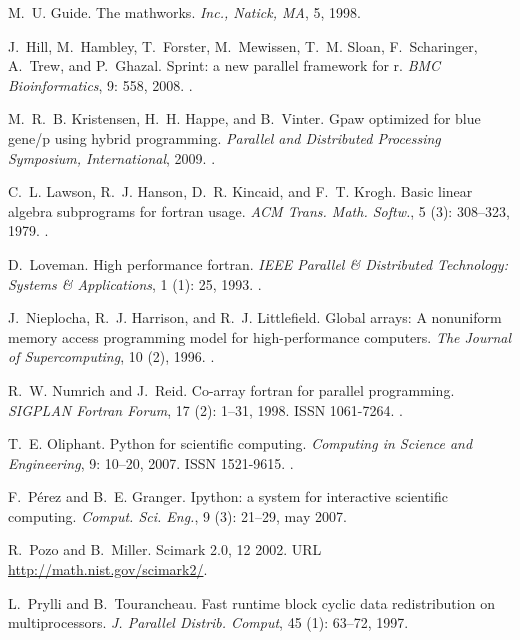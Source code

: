 \documentclass{sigplanconf}
\begin{document}
\begin{thebibliography}{18}
M.~U. Guide.
\newblock The mathworks.
\newblock \emph{Inc., Natick, MA}, 5, 1998.

J.~Hill, M.~Hambley, T.~Forster, M.~Mewissen, T.~M. Sloan, F.~Scharinger,
  A.~Trew, and P.~Ghazal.
\newblock Sprint: a new parallel framework for r.
\newblock \emph{BMC Bioinformatics}, 9: 558, 2008.
\newblock {}.

M.~R.~B. Kristensen, H.~H. Happe, and B.~Vinter.
\newblock Gpaw optimized for blue gene/p using hybrid programming.
\newblock \emph{Parallel and Distributed Processing Symposium, International},
  2009.
\newblock {}.

C.~L. Lawson, R.~J. Hanson, D.~R. Kincaid, and F.~T. Krogh.
\newblock Basic linear algebra subprograms for fortran usage.
\newblock \emph{ACM Trans. Math. Softw.}, 5 (3): 308--323,
  1979.
\newblock {}.

D.~Loveman.
\newblock High performance fortran.
\newblock \emph{IEEE Parallel \& Distributed Technology: Systems \&
  Applications}, 1 (1): 25, 1993.
\newblock {}.

J.~Nieplocha, R.~J. Harrison, and R.~J. Littlefield.
\newblock Global arrays: A nonuniform memory access programming model for
  high-performance computers.
\newblock \emph{The Journal of Supercomputing}, 10 (2), 1996.
\newblock {}.

R.~W. Numrich and J.~Reid.
\newblock Co-array fortran for parallel programming.
\newblock \emph{SIGPLAN Fortran Forum}, 17 (2): 1--31, 1998.
\newblock ISSN 1061-7264.
\newblock {}.

T.~E. Oliphant.
\newblock Python for scientific computing.
\newblock \emph{Computing in Science and Engineering}, 9: 10--20,
  2007.
\newblock ISSN 1521-9615.
\newblock {}.

F.~P{\'{e}}rez and B.~E. Granger.
\newblock Ipython: a system for interactive scientific computing.
\newblock \emph{Comput. Sci. Eng.}, 9 (3): 21--29, may 2007.

R.~Pozo and B.~Miller.
\newblock Scimark 2.0, 12 2002.
\newblock URL \url{http://math.nist.gov/scimark2/}.

L.~Prylli and B.~Tourancheau.
\newblock Fast runtime block cyclic data redistribution on multiprocessors.
\newblock \emph{J. Parallel Distrib. Comput}, 45 (1): 63--72,
  1997.

\end{thebibliography}
\end{document}
